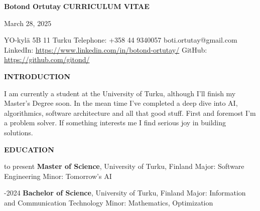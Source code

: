 \documentclass{article}
\begin{document}
\noindent
\textbf{\LARGE Botond Ortutay} \hfill \textbf{\LARGE CURRICULUM VITAE}
\vspace{0.5cm} %

\noindent \hfill March 28, 2025

\vspace{0.3cm} %

\noindent
YO-kylä 5B 11  Turku \newline
Telephone: +358 44 9340057 \newline
boti.ortutay@gmail.com \newline
LinkedIn: \href{https://www.linkedin.com/in/botond-ortutay/}{https://www.linkedin.com/in/botond-ortutay/} \newline
GitHub: \href{https://github.com/gitond/}{https://github.com/gitond/} \newline

\vspace{1cm}
\textbf{\LARGE INTRODUCTION}
\vspace{0.5cm}

\noindent I am currently a student at the University of Turku, although I'll 
finish my Master's Degree soon. In the mean time I've completed a deep dive 
into AI, algorithmics, software architecture and all that good stuff. First 
and foremost I'm a problem solver. If something interests me I find serious 
joy in building solutions.

\vspace{1cm}
\textbf{\LARGE EDUCATION}
\vspace{0.5cm}

 to present \hspace{1cm}\textbf{Master of Science}, University of Turku, Finland \newline
\hspace*{3.35cm} Major: Software Engineering \newline
\hspace*{3.35cm} Minor: Tomorrow's AI \newline
\vspace{0.5cm}

-2024 \hspace{1.85cm}\textbf{Bachelor of Science}, University of Turku, Finland \newline
\hspace*{3.35cm} Major: Information and Communication Technology \newline
\hspace*{3.35cm} Minor: Mathematics, Optimization \newline
\vspace{0.5cm}
\end{document}
